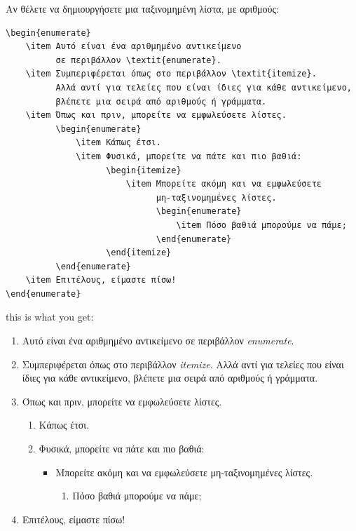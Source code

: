\documentclass[inscr,ack,preface]{dimscthesis}
\begin{document}
\clearpage

Αν θέλετε να δημιουργήσετε μια ταξινομημένη λίστα, με αριθμούς:
\begin{verbatim}
\begin{enumerate}
    \item Αυτό είναι ένα αριθμημένο αντικείμενο
          σε περιβάλλον \textit{enumerate}.
    \item Συμπεριφέρεται όπως στο περιβάλλον \textit{itemize}.
          Αλλά αντί για τελείες που είναι ίδιες για κάθε αντικείμενο,
          βλέπετε μια σειρά από αριθμούς ή γράμματα.
    \item Όπως και πριν, μπορείτε να εμφωλεύσετε λίστες.
          \begin{enumerate}
              \item Κάπως έτσι.
              \item Φυσικά, μπορείτε να πάτε και πιο βαθιά:
                    \begin{itemize}
                        \item Μπορείτε ακόμη και να εμφωλεύσετε
                              μη-ταξινομημένες λίστες.
                              \begin{enumerate}
                                  \item Πόσο βαθιά μπορούμε να πάμε;
                              \end{enumerate}
                    \end{itemize}
          \end{enumerate}
    \item Επιτέλους, είμαστε πίσω!
\end{enumerate}
\end{verbatim}

this is what you get:
\begin{enumerate}
    \item Αυτό είναι ένα αριθμημένο αντικείμενο
          σε περιβάλλον \textit{enumerate}.
    \item Συμπεριφέρεται όπως στο περιβάλλον \textit{itemize}.
          Αλλά αντί για τελείες που είναι ίδιες για κάθε αντικείμενο,
          βλέπετε μια σειρά από αριθμούς ή γράμματα.
    \item Όπως και πριν, μπορείτε να εμφωλεύσετε λίστες.
          \begin{enumerate}
              \item Κάπως έτσι.
              \item Φυσικά, μπορείτε να πάτε και πιο βαθιά:
              \begin{itemize}
                  \item Μπορείτε ακόμη και να εμφωλεύσετε
                        μη-ταξινομημένες λίστες.
                  \begin{enumerate}
                      \item Πόσο βαθιά μπορούμε να πάμε;
                  \end{enumerate}
              \end{itemize}
          \end{enumerate}
    \item Επιτέλους, είμαστε πίσω!
\end{enumerate}
\end{document}
